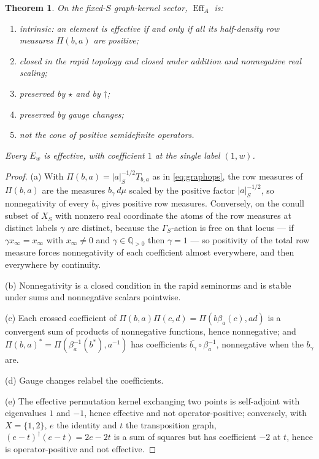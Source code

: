 \documentclass[11pt]{amsart}
\newtheorem{theorem}{Theorem}[section]
\theoremstyle{definition}
\theoremstyle{remark}
\newcommand{\Q}{\mathbb Q}
\newcommand{\Eff}{\operatorname{Eff}}
\begin{document}
\begin{theorem}\label{thm:cone}
On the fixed-$S$ graph-kernel sector, $\Eff_A$ is:
\begin{enumerate}
\item[(a)] \emph{intrinsic}: an element is effective if and only if all its
half-density row measures $\Pi(b,a)$ are positive;
\item[(b)] closed in the rapid topology and closed under addition and
nonnegative real scaling;
\item[(c)] preserved by $\star$ and by $\dagger$;
\item[(d)] preserved by gauge changes;
\item[(e)] \emph{not} the cone of positive semidefinite operators.
\end{enumerate}
Every $E_w$ is effective, with coefficient $1$ at the single label $(1,w)$.
\end{theorem}

\begin{proof}
(a)  With $\Pi(b,a)=|a|_S^{-1/2}T_{b,a}$ as in \eqref{eq:graphops}, the row
measures of $\Pi(b,a)$ are the measures $b_{\gamma}\,d\mu$ scaled by the
positive factor $|a|_S^{-1/2}$, so nonnegativity of every $b_{\gamma}$ gives
positive row measures.  Conversely, on the conull subset of $X_S$ with nonzero
real coordinate the atoms of the row measures at distinct labels $\gamma$ are
distinct, because the $\Gamma_S$-action is free on that locus --- if
$\gamma x_{\infty}=x_{\infty}$ with $x_{\infty}\ne0$ and $\gamma\in\Q_{>0}$
then $\gamma=1$ --- so positivity of the total row
measure forces nonnegativity of each coefficient almost everywhere, and then
everywhere by continuity.

(b)  Nonnegativity is a closed condition in the rapid seminorms and is stable
under sums and nonnegative scalars pointwise.

(c)  Each crossed coefficient of $\Pi(b,a)\Pi(c,d)=\Pi(b\beta_a(c),ad)$ is a
convergent sum of products of nonnegative functions, hence nonnegative; and
$\Pi(b,a)^{*}=\Pi(\beta_a^{-1}(b^{*}),a^{-1})$ has coefficients
$\overline{b_{\gamma}}\circ\beta_a^{-1}$, nonnegative when the $b_{\gamma}$ are.

(d)  Gauge changes relabel the coefficients.

(e)  The effective permutation kernel exchanging two points is self-adjoint
with eigenvalues $1$ and $-1$, hence effective and not operator-positive;
conversely, with $X=\{1,2\}$, $e$ the identity and $t$ the transposition graph,
$(e-t)^{\dagger}(e-t)=2e-2t$ is a sum of squares but has coefficient $-2$ at
$t$, hence is operator-positive and not effective.
\end{proof}
\end{document}
